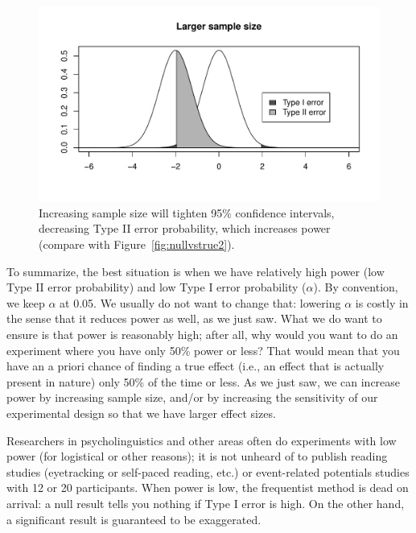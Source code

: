 \documentclass[12pt]{book}\usepackage[]{graphicx}\usepackage[]{color}
\makeatletter
\def\maxwidth{ %
  \ifdim\Gin@nat@width>\linewidth
    \linewidth
  \else
    \Gin@nat@width
  \fi
}
\newenvironment{knitrout}{}{} %
\makeatother
\begin{document}
\begin{figure}[!htbp]
\centering 
\begin{knitrout}
\color{fgcolor}
\includegraphics[width=\maxwidth]{figure/unnamed-chunk-65-1} 

\end{knitrout}
  \caption{Increasing sample size will tighten 95\% confidence intervals, decreasing Type II error probability, which increases power (compare with Figure~\ref{fig:nullvstrue2}).}
  \label{fig:nullvstrue5}
\end{figure}

To summarize, the best situation is when we have relatively high power
(low Type II error probability) and low Type I error probability
($\alpha$). By convention, we keep $\alpha$ at 0.05. We usually do not
want to change that: lowering $\alpha$ is costly in the sense that it
reduces power as well, as we just saw. What we do want to ensure is
that power is reasonably high; after all, why would you want to do an
experiment where you have only 50\% power or less? That would mean
that you have an a priori chance of finding a true effect (i.e., an
effect that is actually present in nature) only 50\% of the time or
less. As we just saw, we can increase power by increasing sample size,
and/or by increasing the sensitivity of our experimental design so that
we have larger effect sizes.

Researchers in psycholinguistics and other areas often do experiments
with low power (for logistical or other reasons); it is not unheard of
to publish reading studies (eyetracking or self-paced reading, etc.) or event-related potentials studies with 12 or 20 participants. When power is low, the frequentist method is dead on arrival: a null result tells you nothing if Type I error is high. 
On the other hand, a significant result is guaranteed to be 
exaggerated.  
\end{document}
